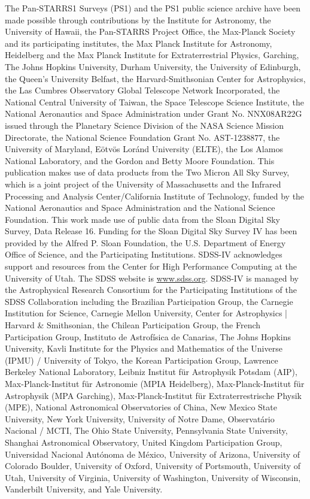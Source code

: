 \documentclass{aa}
\begin{document}
\begin{acknowledgements}
The Pan-STARRS1 Surveys (PS1) and the PS1 public science archive have been made possible through contributions by the Institute for Astronomy, the University of Hawaii, the Pan-STARRS Project Office, the Max-Planck Society and its participating institutes, the Max Planck Institute for Astronomy, Heidelberg and the Max Planck Institute for Extraterrestrial Physics, Garching, The Johns Hopkins University, Durham University, the University of Edinburgh, the Queen's University Belfast, the Harvard-Smithsonian Center for Astrophysics, the Las Cumbres Observatory Global Telescope Network Incorporated, the National Central University of Taiwan, the Space Telescope Science Institute, the National Aeronautics and Space Administration under Grant No. NNX08AR22G issued through the Planetary Science Division of the NASA Science Mission Directorate, the National Science Foundation Grant No. AST-1238877, the University of Maryland, E\"{o}tv\"{o}s Lor\'{a}nd University (ELTE), the Los Alamos National Laboratory, and the Gordon and Betty Moore Foundation.
This publication makes use of data products from the Two Micron All Sky Survey, which is a joint project of the University of Massachusetts and the Infrared Processing and Analysis Center/California Institute of Technology, funded by the National Aeronautics and Space Administration and the National Science Foundation.
This work made use of public data from the Sloan Digital Sky Survey, Data Release 16. Funding for the Sloan Digital Sky Survey IV has been provided by the Alfred P. Sloan Foundation, the U.S. Department of Energy Office of Science, and the Participating Institutions. 
SDSS-IV acknowledges support and resources from the Center for High Performance Computing  at the University of Utah. The SDSS website is \url{www.sdss.org}.
SDSS-IV is managed by the Astrophysical Research Consortium for the Participating Institutions of the SDSS Collaboration including the Brazilian Participation Group, the Carnegie Institution for Science, Carnegie Mellon University, Center for Astrophysics | Harvard \& Smithsonian, the Chilean Participation Group, the French Participation Group, Instituto de Astrof\'isica de Canarias, The Johns Hopkins University, Kavli Institute for the Physics and Mathematics of the Universe (IPMU) / University of Tokyo, the Korean Participation Group, Lawrence Berkeley National Laboratory, Leibniz Institut f\"ur Astrophysik Potsdam (AIP),  Max-Planck-Institut f\"ur Astronomie (MPIA Heidelberg), Max-Planck-Institut f\"ur Astrophysik (MPA Garching), Max-Planck-Institut f\"ur Extraterrestrische Physik (MPE), National Astronomical Observatories of China, New Mexico State University, New York University, University of Notre Dame, Observat\'ario Nacional / MCTI, The Ohio State University, Pennsylvania State University, Shanghai Astronomical Observatory, United Kingdom Participation Group, Universidad Nacional Aut\'onoma de M\'exico, University of Arizona, University of Colorado Boulder, University of Oxford, University of Portsmouth, University of Utah, University of Virginia, University of Washington, University of Wisconsin, Vanderbilt University, and Yale University.

\end{acknowledgements}
\end{document}
